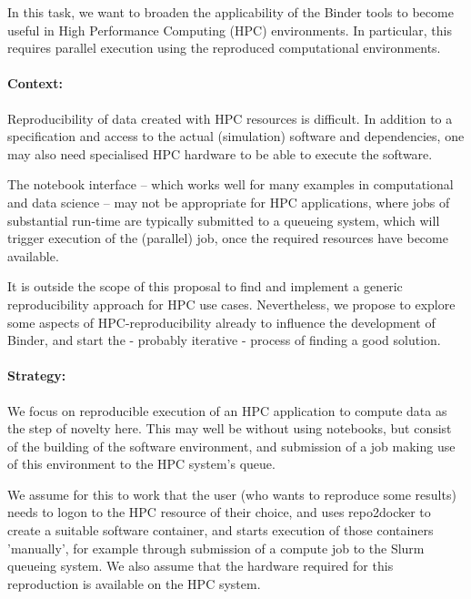 \begin{task}[
  title=Binder at HPC facilities,
  id=binder-at-hpc,
  lead=MP,
  PM=17,
  wphases={0-36},
  partners={IFR,UIO}
]
In this task, we want to broaden the applicability of the Binder tools to become
useful in High Performance Computing (HPC) environments. In particular, this
requires parallel execution using the reproduced computational environments.

\paragraph*{Context:}
Reproducibility of data created with HPC resources is difficult. In addition to
a specification and access to the actual (simulation) software and dependencies,
one may also need specialised HPC hardware to be able to execute the software.

The notebook interface -- which works well for many examples in computational and
data science -- may not be appropriate for HPC applications, where jobs of
substantial run-time are typically submitted to a queueing system, which will
trigger execution of the (parallel) job, once the required resources have become
available.

It is outside the scope of this proposal to find and implement a generic
reproducibility approach for HPC use cases. Nevertheless, we propose to explore
some aspects of HPC-reproducibility already to influence the development of Binder,
and start the - probably iterative - process of finding a good solution.

\paragraph*{Strategy:}
We focus on reproducible execution of an HPC application to compute data as the step of
novelty here. This may well be without using notebooks, but consist of the
building of the software environment, and submission of a job making use of this
environment to the HPC system's queue.

We assume for this to work that the user (who wants to reproduce some results)
needs to logon to the HPC resource of their choice, and uses repo2docker to
create a suitable software container, and starts execution of those containers
'manually', for example through submission of a compute job to the Slurm
queueing system. We also assume that the hardware required for this reproduction
is available on the HPC system.


\end{task}
